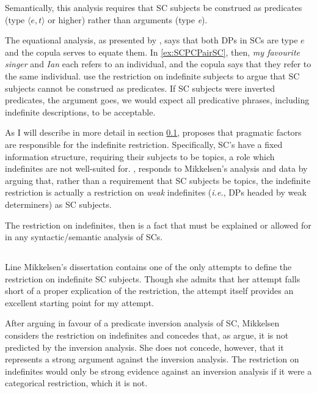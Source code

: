 \documentclass[letterpaper]{article}
\begin{document}
Semantically, this analysis requires that SC subjects be construed as predicates (type $\langle e,t\rangle$ or higher) rather than arguments (type \textit{e}).

The equational analysis, as presented by \textcite{heycockkroch1999pseudocleft}, says that both DPs in SCs are type $e$ and the copula serves to equate them.
In \ref{ex:SCPCPairSC}, then, \textit{my favourite singer} and \textit{Ian} each refers to an individual, and the copula says that they refer to the same individual.
\textcite{heycockkroch1999pseudocleft} use the restriction on indefinite subjects to argue that SC subjects cannot be construed as predicates.
If SC subjects were inverted predicates, the argument goes, we would expect all predicative phrases, including indefinite descriptions, to be acceptable.

As I will describe in more detail in section \ref{sec:Mikkelsen}, \textcite{mikkelsen2005copular} proposes that pragmatic factors are responsible for the indefinite restriction.
Specifically, SC's have a fixed information structure, requiring their subjects to be topics, a role which indefinites are not well-suited for.
\textcite{heycock2012specification}, responds to Mikkelsen's analysis and data  by arguing that, rather than a requirement that SC subjects be topics, the indefinite restriction is actually a restriction on \textit{weak} indefinites (\textit{i.e.}, DPs headed by weak determiners) as SC subjects.

The restriction on indefinites, then is a fact that must be explained or allowed for in any syntactic/semantic analysis of SCs.

\subsection{\textcite{mikkelsen2005copular}}\label{sec:Mikkelsen}
Line Mikkelsen's dissertation \parencite[published as][]{mikkelsen2005copular} contains one of the only attempts to define the restriction on indefinite SC subjects.
Though she admits that her attempt falls short of a proper explication of the restriction, the attempt itself provides an excellent starting point for my attempt.

After arguing in favour of a predicate inversion analysis of SC, Mikkelsen considers the restriction on indefinites and concedes that, as \textcite{heycockkroch1999pseudocleft} argue, it is not predicted by the inversion analysis.
She does not concede, however, that it represents a strong argument against the inversion analysis.
The restriction on indefinites would only be strong evidence against an inversion analysis if it were a categorical restriction, which it is not.
\end{document}
